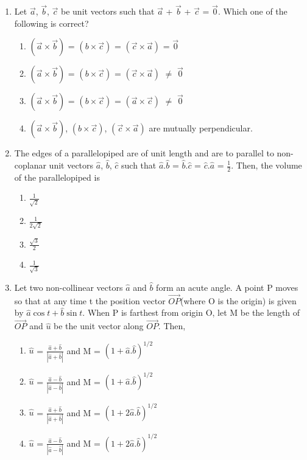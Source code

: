 \begin{enumerate}[label=\arabic*.,ref=\thesubsection.\theenumi]
\item Let $\overrightarrow{a}$, $\overrightarrow{b}$, $\overrightarrow{c}$ be unit vectors such that 
$\overrightarrow{a}$ + $\overrightarrow{b}$ + $\overrightarrow{c}$ = $\overrightarrow{0}$. Which one of the following is correct?
\begin{enumerate}
\item $(\overrightarrow{a} \times \overrightarrow{b})$ = $(b \times \overrightarrow{c})$ = $(\overrightarrow{c} \times \overrightarrow{a})$ = $\overrightarrow{0}$
\item $(\overrightarrow{a} \times \overrightarrow{b})$ = $(b \times \overrightarrow{c})$ = $(\overrightarrow{c} \times \overrightarrow{a})$ $\neq$ $\overrightarrow{0}$
\item $(\overrightarrow{a} \times \overrightarrow{b})$ = $(b \times \overrightarrow{c})$ = $(\overrightarrow{a} \times \overrightarrow{c})$ $\neq$ $\overrightarrow{0}$
\item $(\overrightarrow{a} \times \overrightarrow{b})$, $(b \times \overrightarrow{c})$, $(\overrightarrow{c} \times \overrightarrow{a})$ are mutually perpendicular.
\end{enumerate}

\item The edges of a parallelopiped are of unit length and are to parallel to non-coplanar unit vectors $\hat{a}$, $\hat{b}$, $\hat{c}$ such that $\hat{a}$.$\hat{b}$ = $\hat{b}$.$\hat{c}$ = $\hat{c}$.$\hat{a}$ = $\frac{1}{2}$. Then, the volume of the parallelopiped is
\begin{enumerate}
\item $\frac{1}{\sqrt{2}}$
\item $\frac{1}{2\sqrt{2}}$
\item $\frac{\sqrt{3}}{2}$
\item $\frac{1}{\sqrt{3}}$
\end{enumerate}

\item Let two non-collinear vectors $\hat{a}$ and $\hat{b}$ form an acute angle. A point P moves so that at any time t the position vector $\overrightarrow{OP}$(where O is the origin) is given by $\hat{a}\cos t + \hat{b}\sin t$. When P is farthest from origin O, let M be the length of $\overrightarrow{OP}$ and $\hat{u}$ be the unit vector along $\overrightarrow{OP}$. Then,
\begin{enumerate}
\item $\hat{u}$ = $\frac{\hat{a} + \hat{b}}{|\hat{a} + \hat{b}|}$ and M = $(1 + \hat{a}.\hat{b})^{1/2}$
\item $\hat{u}$ = $\frac{\hat{a} - \hat{b}}{|\hat{a} - \hat{b}|}$ and M = $(1 + \hat{a}.\hat{b})^{1/2}$
\item $\hat{u}$ = $\frac{\hat{a} + \hat{b}}{|\hat{a} + \hat{b}|}$ and M = $(1 + 2\hat{a}.\hat{b})^{1/2}$
\item $\hat{u}$ = $\frac{\hat{a} - \hat{b}}{|\hat{a} - \hat{b}|}$ and M = $(1 + 2\hat{a}.\hat{b})^{1/2}$
\end{enumerate}


\end{enumerate}
